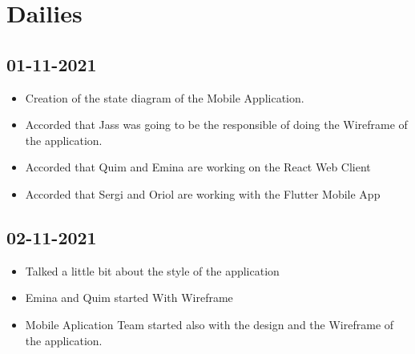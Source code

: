 \documentclass[./main.tex]{subfiles}
\begin{document}
\section{Dailies}

\subsection{01-11-2021}
\begin{itemize}
\item Creation of the state diagram of the Mobile Application.
\item Accorded that Jass was going to be the responsible of doing the Wireframe of the application.
\item Accorded that Quim and Emina are working on the React Web Client
\item Accorded that Sergi and Oriol are working with the Flutter Mobile App
\end{itemize}

\subsection{02-11-2021}
\begin{itemize}
\item Talked a little bit about the style of the application
\item Emina and Quim started With Wireframe
\item Mobile Aplication Team started also with the design and the Wireframe of the application.
\end{itemize}
\end{document}
